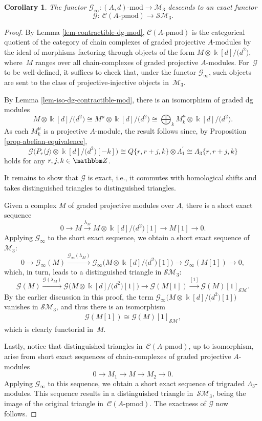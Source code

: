 \documentclass[10pt,a4paper]{amsart}
\newtheorem{cor}[thm]{Corollary}
\theoremstyle{definition}
\numberwithin{equation}{section}
\def\Z{{\mathbbm Z}}
\def\lra{{\longrightarrow}}
\def\dmod{{\mathrm{\mbox{-}mod}}} %
\def\pmod{{\mathrm{\mbox{-}pmod}}} %
\def\mc{\mathcal}
\begin{document}
\begin{cor}\label{cor-functor-G}
The functor $\mc{G}_\infty\colon (A,d)\dmod\lra \mc{M}_3$ descends to an exact functor
\[
\mc{G}\colon \ \mc{C}(A\pmod)\lra \mc{SM}_3.
\]
\end{cor}
\begin{proof}By Lemma \ref{lem-contractible-dg-mod}, $\mc{C}(A\pmod)$ is the categorical quotient of the category of chain complexes of graded projective $A$-modules by the ideal of morphisms factoring through objects of the form $M\otimes\Bbbk[d]/\big(d^2\big)$, where~$M$ ranges over all chain-complexes of graded projective $A$-modules. For~$\mc{G}$ to be well-defined, it suffices to check that, under the functor $\mc{G}_\infty$, such objects are sent to the class of projective-injective objects in~$\mc{M}_3$.

By Lemma \ref{lem-iso-dg-contractible-mod}, there is an isomorphism of graded dg modules
\[
M\otimes \Bbbk[d]/\big(d^2\big)\cong M^\mu \otimes \Bbbk[d]/\big(d^2\big)\cong \bigoplus_k M^\mu_k \otimes \Bbbk[d]/\big(d^2\big).
\]
As each $M^\mu_k$ is a projective $A$-module, the result follows since, by Proposition \ref{prop-abelian-equivalence},
\[
\mc{G}\big(P_{r}\langle j\rangle \otimes \Bbbk[d]/\big(d^2\big)[-k]\big)\cong Q\{r,r+j,k\}\otimes \Lambda_1^\prime \cong \Lambda_3\{r,r+j,k\}
\]
holds for any $r,j,k\in \Z$.

It remains to show that $\mc{G}$ is exact, i.e., it commutes with homological shifts and takes distinguished triangles to distinguished triangles.

Given a complex $M$ of graded projective modules over $A$, there is a short exact sequence
\[
0\lra M \stackrel{\lambda_M}{\lra} M\otimes \Bbbk[d]/\big(d^2\big)[1] \lra M[1]\lra 0.
\]
Applying $\mc{G}_\infty$ to the short exact sequence, we obtain a short exact sequence of $\mc{M}_3$:
\[
0\lra \mc{G}_\infty(M) \xrightarrow{ \mc{G}_\infty(\lambda_M)} \mc{G}_\infty \big(M\otimes \Bbbk[d]/\big(d^2\big)[1]\big) \lra \mc{G}_\infty( M[1])\lra 0,
\]
which, in turn, leads to a distinguished triangle in $\mc{SM}_3$:
\[
 \mc{G}(M) \xrightarrow{ \mc{G}(\lambda_M)} \mc{G} \big(M\otimes \Bbbk[d]/\big(d^2\big)[1]\big) \lra \mc{G}( M[1]) \stackrel{[1]}{\lra} \mc{G}(M)[1]_{\mc{SM}}.
\]
By the earlier discussion in this proof, the term $ \mc{G}_\infty \big(M\otimes \Bbbk[d]/\big(d^2\big)[1]\big)$ vanishes in $\mc{SM}_3$, and thus there is an isomorphism
\begin{gather*}
\mc{G}( M[1]) \cong \mc{G}(M)[1]_{\mc{SM}},
\end{gather*}
which is clearly functorial in~$M$.

Lastly, notice that distinguished triangles in~$\mc{C}(A\pmod)$, up to isomorphism, arise from short exact sequences of chain-complexes of graded projective $A$-modules
\[
0\lra M_1\lra M \lra M_2\lra 0.
\]
Applying $\mc{G}_\infty$ to this sequence, we obtain a short exact sequence of trigraded $\Lambda_3$-modules. This sequence results in a distinguished triangle in~$\mc{SM}_3$, being the image of the original triangle in~$\mc{C}(A\pmod)$. The exactness of $\mc{G}$ now follows.
\end{proof}
\end{document}
